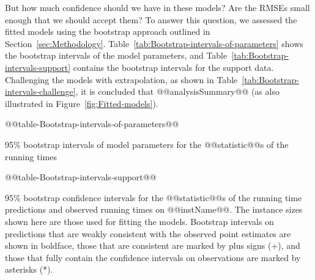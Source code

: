 But how much confidence should we have in these models? Are the RMSEs
small enough that we should accept them? To answer this question,
we assessed the fitted models using the bootstrap approach outlined
in Section~\ref{sec:Methodology}. Table~\ref{tab:Bootstrap-intervals-of-parameters}
shows the bootstrap intervals of the model parameters,
and Table~\ref{tab:Bootstrap-intervals-support}
contains the bootstrap intervals for the support data.
Challenging the models with extrapolation, as shown in 
Table~\ref{tab:Bootstrap-intervals-challenge}, it is concluded that
@@analysisSummary@@
(as also illustrated in Figure~\ref{fig:Fitted-models}). 
\begin{table*}[tb]
\noindent \begin{centering}
@@table-Bootstrap-intervals-of-parameters@@
% 

\par\end{centering}
\caption{\label{tab:Bootstrap-intervals-of-parameters} 95\% bootstrap intervals
of model parameters for the @@statistic@@s of the  running times}
\end{table*}
\begin{table*}[tb]
\noindent \begin{centering}
@@table-Bootstrap-intervals-support@@
% 
\par\end{centering}

\caption{\label{tab:Bootstrap-intervals-support} 95\% bootstrap confidence intervals
for the @@statistic@@s of the  running time predictions and observed running times on @@instName@@. 
The instance sizes shown here are those used for fitting the models.
Bootstrap intervals on predictions that are weakly consistent
with the observed point estimates are shown in boldface, 
those that are consistent are marked by plus signs ({+}),
and those that fully contain the confidence intervals on 
observations are marked by asterisks ({*}).}
\end{table*}

